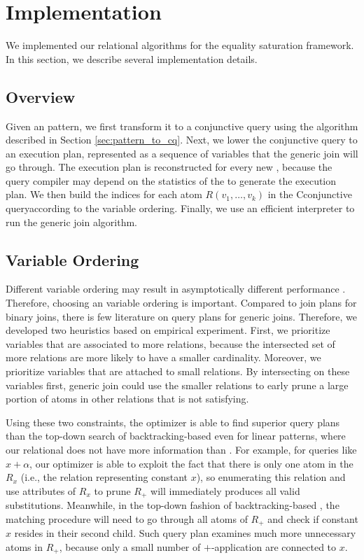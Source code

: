 \chapter{Implementation}

We implemented our relational \ematching algorithms for the \egg equality saturation framework. In this section, we describe several implementation details. 

\section{Overview}
Given an \ematching pattern, we first transform it to a conjunctive query using the algorithm described in Section \ref{sec:pattern_to_cq}. Next, we lower the conjunctive query to an execution plan, represented as a sequence of variables that the generic join will go through. The execution plan is reconstructed for every new \egraph, because the query compiler may depend on the statistics of the \egraph to generate the execution plan. We then build the indices for each atom $R(v_1,\ldots,v_k)$ in the Cconjunctive queryaccording to the variable ordering. Finally, we use an efficient interpreter to run the generic join algorithm.

\section{Variable Ordering}

Different variable ordering may result in asymptotically different performance \citep{eval-wcoj, emptyheaded}. 
Therefore, choosing an variable ordering is important. 
Compared to join plans for binary joins, there is few literature on query plans for generic joins.
Therefore, we developed two heuristics based on empirical experiment. 
First, we prioritize variables that are associated to more relations, because the intersected set of more relations are more likely to have a smaller cardinality. 
Moreover, we prioritize variables that are attached to small relations. 
By intersecting on these variables first, generic join could use the smaller relations to early prune a large portion of atoms in other relations that is not satisfying. 

Using these two constraints, the optimizer is able to find superior query plans than the top-down search of backtracking-based \ematching even for linear patterns, where our relational \ematching does not have more information than \ematching. 
For example, for queries like $x+\alpha$, our optimizer is able to exploit the fact that there is only one atom in the $R_x$ (i.e., the relation representing constant $x$), so enumerating this relation and use attributes of $R_x$ to prune $R_+$ will immediately produces all valid substitutions. Meanwhile, in the top-down fashion of backtracking-based \ematching, the matching procedure will need to go through all atoms of $R_+$ and check if constant $x$ resides in their second child. Such query plan examines much more unnecessary atoms in $R_+$, because only a small number of $+$-application \enodes are connected to $x$.

